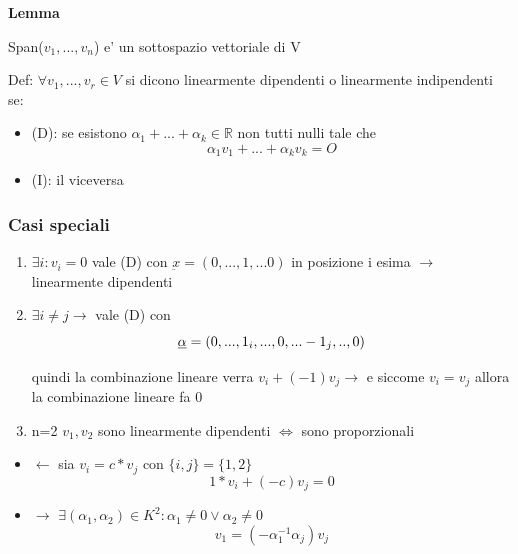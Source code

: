 \documentclass{article}
\begin{document}
\textbf{Lemma}
\begin{flushleft}
	Span($v_1,...,v_n$) e' un sottospazio vettoriale di V
\end{flushleft}
\begin{flushleft}
	Def: $\forall v_1,...,v_r \in V $ si dicono linearmente dipendenti o linearmente indipendenti se:
\end{flushleft}
\begin{itemize}
	\item (D): se esistono $\alpha_1 +...+\alpha_k \in \mathbb{R}$ non tutti nulli tale che
	      \begin{equation*}
		      \alpha_1 v_1+...+\alpha_k v_k = O
	      \end{equation*}
	\item (I): il viceversa
\end{itemize}
\subsubsection*{Casi speciali}
\begin{enumerate}
	\item $\exists i : v_i =0$ vale (D) con $\underbar{x} = (0,...,1,...0)$ in posizione i esima $\to$ linearmente dipendenti
	\item $\exists i \neq j \to$ vale (D) con
	      \begin{equation*}
		      \underbar{$\alpha$}=(0,...,1_i,...,0,...-1_j,..,0)
	      \end{equation*}
	      \begin{flushleft}
		      quindi la combinazione lineare verra $v_i+(-1)v_j \to $ e siccome $v_i=v_j$ allora la combinazione lineare fa 0
	      \end{flushleft}
	\item n=2 $v_1,v_2$ sono linearmente dipendenti $\iff$ sono proporzionali
\end{enumerate}
\begin{itemize}
	\item $\leftarrow$ sia $v_i=c*v_j$ con $\{ i,j \}=\{1,2\}$
	      \begin{equation*}
		      1*v_i+(-c)v_j=0
	      \end{equation*}
	\item $\rightarrow$ $\exists (\alpha_1,\alpha_2) \in K^2: \alpha_1 \neq 0 \lor \alpha_2 \neq 0$
	      \begin{equation*}
		      v_1=(-\alpha_1^{-1}\alpha_j)v_j
	      \end{equation*}
\end{itemize}
\end{document}
